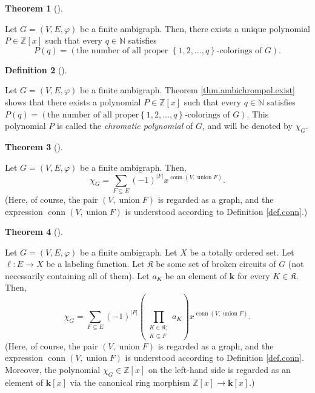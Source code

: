 \documentclass[numbers=enddot,12pt,final,onecolumn,notitlepage]{scrartcl}%
\theoremstyle{definition}
\newtheorem{theo}{Theorem}[section]
\newenvironment{theorem}[1][]
{\begin{theo}[#1]\begin{leftbar}}
{\end{leftbar}\end{theo}}
\newtheorem{defi}[theo]{Definition}
\newenvironment{definition}[1][]
{\begin{defi}[#1]\begin{leftbar}}
{\end{leftbar}\end{defi}}
\let\sumnonlimits\sum
\let\prodnonlimits\prod
\renewcommand{\sum}{\sumnonlimits\limits}
\renewcommand{\prod}{\prodnonlimits\limits}
\begin{document}
\begin{theorem}
\label{thm.ambichrompol.exist}Let $G=\left(  V,E,\varphi\right)  $ be a finite
ambigraph. Then, there exists a unique polynomial $P\in\mathbb{Z}\left[
x\right]  $ such that every $q\in\mathbb{N}$ satisfies%
\[
P\left(  q\right)  =\left(  \text{the number of all proper }\left\{
1,2,\ldots,q\right\}  \text{-colorings of }G\right)  .
\]

\end{theorem}

\begin{definition}
\label{def.ambichrompol}Let $G=\left(  V,E,\varphi\right)  $ be a finite
ambigraph. Theorem \ref{thm.ambichrompol.exist} shows that there exists a
polynomial $P\in\mathbb{Z}\left[  x\right]  $ such that every $q\in\mathbb{N}$
satisfies $P\left(  q\right)  =\left(  \text{the number of all proper
}\left\{  1,2,\ldots,q\right\}  \text{-colorings of }G\right)  $. This
polynomial $P$ is called the \emph{chromatic polynomial} of $G$, and will be
denoted by $\chi_{G}$.
\end{definition}

\begin{theorem}
\label{thm.ambichrompol.empty}Let $G=\left(  V,E,\varphi\right)  $ be a finite
ambigraph. Then,%
\[
\chi_{G}=\sum_{F\subseteq E}\left(  -1\right)  ^{\left\vert F\right\vert
}x^{\operatorname*{conn}\left(  V,\operatorname*{union}F\right)  }.
\]
(Here, of course, the pair $\left(  V,\operatorname*{union}F\right)  $ is
regarded as a graph, and the expression $\operatorname*{conn}\left(
V,\operatorname*{union}F\right)  $ is understood according to Definition
\ref{def.conn}.)
\end{theorem}

\begin{theorem}
\label{thm.ambichrompol.varis}Let $G=\left(  V,E,\varphi\right)  $ be a finite
ambigraph. Let $X$ be a totally ordered set. Let $\ell:E\rightarrow X$ be a
labeling function. Let $\mathfrak{K}$ be some set of broken circuits of $G$
(not necessarily containing all of them). Let $a_{K}$ be an element of
$\mathbf{k}$ for every $K\in\mathfrak{K}$. Then,%
\[
\chi_{G}=\sum_{F\subseteq E}\left(  -1\right)  ^{\left\vert F\right\vert
}\left(  \prod_{\substack{K\in\mathfrak{K};\\K\subseteq F}}a_{K}\right)
x^{\operatorname*{conn}\left(  V,\operatorname*{union}F\right)  }.
\]
(Here, of course, the pair $\left(  V,\operatorname*{union}F\right)  $ is
regarded as a graph, and the expression $\operatorname*{conn}\left(
V,\operatorname*{union}F\right)  $ is understood according to Definition
\ref{def.conn}. Moreover, the polynomial $\chi_{G}\in\mathbb{Z}\left[
x\right]  $ on the left-hand side is regarded as an element of $\mathbf{k}%
\left[  x\right]  $ via the canonical ring morphism $\mathbb{Z}\left[
x\right]  \rightarrow\mathbf{k}\left[  x\right]  $.)
\end{theorem}
\end{document}
